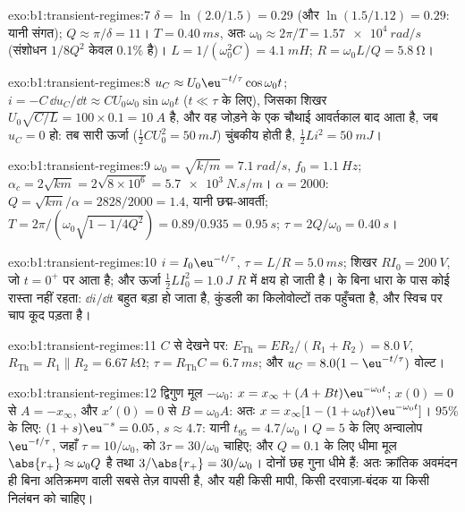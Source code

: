 \begin{solution}{exo:b1:transient-regimes:7}
$\delta = \ln(2.0/1.5) = 0.29$ (और $\ln(1.5/1.12) = 0.29$: यानी संगत);
$Q \approx \pi/\delta = 11$। $T = \qty{0.40}{ms}$, अतः $\omega_0 \approx
2\pi/T = \qty{1.57e4}{rad/s}$ (संशोधन $1/8Q^2$ केवल $0.1\%$ है)।
$L = 1/(\omega_0^2 C) = \qty{4.1}{mH}$; $R = \omega_0 L/Q = \qty{5.8}{\ohm}$।
\end{solution}

\begin{solution}{exo:b1:transient-regimes:8}
$u_C \approx U_0\eu^{-t/\tau}\cos\omega_0 t$; $i = -C\,\dd u_C/\dd t
\approx CU_0\omega_0\sin\omega_0 t$ ($t \ll \tau$ के लिए), जिसका शिखर $U_0\sqrt{C/L}
= 100 \times 0.1 = \qty{10}{A}$ है, और वह जोड़ने के एक चौथाई आवर्तकाल बाद आता है,
जब $u_C = 0$ हो: तब सारी ऊर्जा ($\tfrac12 CU_0^2 = \qty{50}{mJ}$)
चुंबकीय होती है, $\tfrac12 Li^2 = \qty{50}{mJ}$।
\end{solution}

\begin{solution}{exo:b1:transient-regimes:9}
$\omega_0 = \sqrt{k/m} = \qty{7.1}{rad/s}$, $f_0 = \qty{1.1}{Hz}$;
$\alpha_c = 2\sqrt{km} = 2\sqrt{8\times10^6} = \qty{5.7e3}{N.s/m}$।
$\alpha = 2000$: $Q = \sqrt{km}/\alpha = 2828/2000 = 1.4$, यानी छद्म-आवर्ती;
$T = 2\pi/(\omega_0\sqrt{1 - 1/4Q^2}) = 0.89/0.935 = \qty{0.95}{s}$;
$\tau = 2Q/\omega_0 = \qty{0.40}{s}$।
\end{solution}

\begin{solution}{exo:b1:transient-regimes:10}
$i = I_0\eu^{-t/\tau}$, $\tau = L/R = \qty{5.0}{ms}$; शिखर 
$RI_0 = \qty{200}{V}$, जो $t = 0^+$ पर आता है; और ऊर्जा $\tfrac12 LI_0^2 = \qty{1.0}{J}$
$R$ में क्षय हो जाती है।  के बिना धारा के पास कोई रास्ता नहीं रहता:
$\dd i/\dd t$ बहुत बड़ा हो जाता है, कुंडली का  किलोवोल्टों तक पहुँचता है,
और स्विच पर चाप कूद पड़ता है।
\end{solution}

\begin{solution}{exo:b1:transient-regimes:11}
$C$ से देखने पर: $E_{\mathrm{Th}} = ER_2/(R_1 + R_2) = \qty{8.0}{V}$,
$R_{\mathrm{Th}} = R_1 \parallel R_2 = \qty{6.67}{k\ohm}$; $\tau =
R_{\mathrm{Th}}C = \qty{6.7}{ms}$; और $u_C = 8.0(1 - \eu^{-t/\tau})$ वोल्ट।
\end{solution}

\begin{solution}{exo:b1:transient-regimes:12}
द्विगुण मूल $-\omega_0$: $x = x_\infty + (A + Bt)\eu^{-\omega_0 t}$;
$x(0) = 0$ से $A = -x_\infty$, और $x'(0) = 0$ से $B = \omega_0 A$:
अतः $x = x_\infty[1 - (1 + \omega_0 t)\eu^{-\omega_0 t}]$। $95\%$ के लिए:
$(1 + s)\eu^{-s} = 0.05$, $s \approx 4.7$: यानी $t_{95} = 4.7/\omega_0$।
$Q = 5$ के लिए अन्वालोप $\eu^{-t/\tau}$, जहाँ $\tau = 10/\omega_0$, को
$3\tau = 30/\omega_0$ चाहिए; और $Q = 0.1$ के लिए धीमा मूल $\abs{r_+} \approx
\omega_0 Q$ है तथा $3/\abs{r_+} = 30/\omega_0$। दोनों छह गुना धीमे हैं:
अतः क्रांतिक अवमंदन ही बिना अतिक्रमण वाली सबसे तेज़ वापसी है, और यही किसी
मापी, किसी दरवाज़ा-बंदक या किसी निलंबन को चाहिए।
\end{solution}

